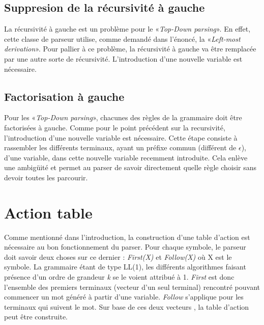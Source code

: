 \documentclass[pdftex,10pt,a4paper]{article} \usepackage[utf8]{inputenc}
\begin{document}
\subsection{Suppresion de la récursivité à gauche}
La récursivité à gauche est un problème pour le «\textit{Top-Down parsing}». En effet, cette classe de parseur utilise, comme demandé dans l'énoncé, la «\textit{Left-most derivation}». Pour pallier à ce problème, la récursivité à gauche va être remplacée par une autre sorte de récursivité. L'introduction d'une nouvelle variable est nécessaire.

\subsection{Factorisation à gauche}
Pour les «\textit{Top-Down parsing}», chacunes des règles de la grammaire doit être factorisées à gauche. Comme pour le point précédent sur la recursivité, l'introduction d'une nouvelle variable est nécessaire. Cette étape consiste à rassembler les différents terminaux, ayant un préfixe commun (différent de $\epsilon$), d'une variable, dans cette nouvelle variable recemment introduite. Cela enlève une ambigüité et permet au parser de savoir directement quelle règle choisir sans devoir toutes les parcourir.

\section{Action table}

Comme mentionné dans l'introduction, la construction d'une table d'action est nécessaire au bon fonctionnement du parser. Pour chaque symbole, le parseur doit savoir deux choses sur ce dernier : \textit{First(X)} et \textit{Follow(X)} où X est le symbole. La grammaire étant de type LL(1), les différents algorithmes faisant présence d'un ordre de grandeur \textit{k} se le voient attribué à 1. \textit{First} est donc l'ensemble des premiers terminaux (vecteur d'un seul terminal) rencontré pouvant commencer un mot généré à partir d'une variable. \textit{Follow} s'applique pour les terminaux qui suivent le mot. Sur base de ces deux vecteurs , la table d'action peut être construite.
\end{document}

